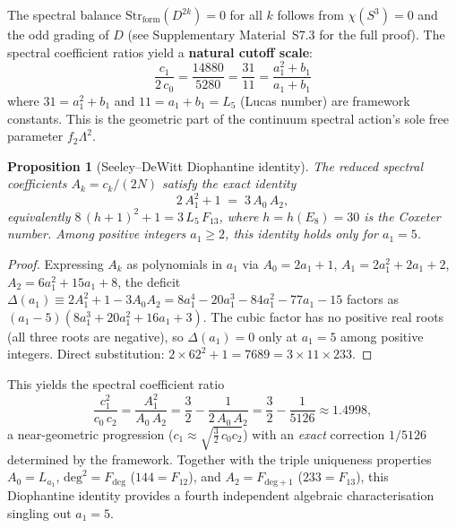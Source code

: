 \documentclass[12pt,a4paper]{article}
\newtheorem{proposition}{Proposition}
\theoremstyle{definition}
\begin{document}
The spectral balance $\mathrm{Str}_{\mathrm{form}}(D^{2k}) = 0$ for all $k$ follows from $\chi(S^3) = 0$ and the odd grading of $D$ (see Supplementary Material~S7.3 for the full proof).  The spectral coefficient ratios yield a \textbf{natural cutoff scale}:
\begin{equation}
\frac{c_1}{2\,c_0} = \frac{14880}{5280} = \frac{31}{11} = \frac{a_1^2 + b_1}{a_1 + b_1}
\label{eq:cutoff_ratio}
\end{equation}
where $31 = a_1^2 + b_1$ and $11 = a_1 + b_1 = L_5$ (Lucas number) are framework constants.  This is the geometric part of the continuum spectral action's sole free parameter $f_2\Lambda^2$.

\begin{proposition}[Seeley--DeWitt Diophantine identity]\label{prop:seeley_diophantine}
The reduced spectral coefficients $A_k = c_k/(2N)$ satisfy the exact identity
\begin{equation}
2\,A_1^2 + 1 \;=\; 3\,A_0\,A_2,
\label{eq:seeley_diophantine}
\end{equation}
equivalently $8\,(h+1)^2 + 1 = 3\,L_5\,F_{13}$, where $h = h(E_8) = 30$ is the Coxeter number.  Among positive integers $a_1 \geq 2$, this identity holds \emph{only} for $a_1 = 5$.
\end{proposition}

\begin{proof}
Expressing $A_k$ as polynomials in $a_1$ via $A_0 = 2a_1+1$, $A_1 = 2a_1^2+2a_1+2$, $A_2 = 6a_1^2+15a_1+8$, the deficit $\Delta(a_1) \equiv 2A_1^2 + 1 - 3A_0 A_2 = 8a_1^4 - 20a_1^3 - 84a_1^2 - 77a_1 - 15$ factors as $(a_1 - 5)(8a_1^3 + 20a_1^2 + 16a_1 + 3)$.  The cubic factor has no positive real roots (all three roots are negative), so $\Delta(a_1) = 0$ only at $a_1 = 5$ among positive integers.  Direct substitution: $2 \times 62^2 + 1 = 7689 = 3 \times 11 \times 233$.
\end{proof}

This yields the spectral coefficient ratio
\begin{equation}
\frac{c_1^2}{c_0\,c_2} = \frac{A_1^2}{A_0\,A_2} = \frac{3}{2} - \frac{1}{2\,A_0\,A_2} = \frac{3}{2} - \frac{1}{5126} \approx 1.4998,
\end{equation}
a near-geometric progression ($c_1 \approx \sqrt{\tfrac{3}{2}\,c_0 c_2}$) with an \emph{exact} correction $1/5126$ determined by the framework.  Together with the triple uniqueness properties $A_0 = L_{a_1}$, $\mathrm{deg}^2 = F_{\mathrm{deg}}$ ($144 = F_{12}$), and $A_2 = F_{\mathrm{deg}+1}$ ($233 = F_{13}$), this Diophantine identity provides a fourth independent algebraic characterisation singling out $a_1 = 5$.
\end{document}
